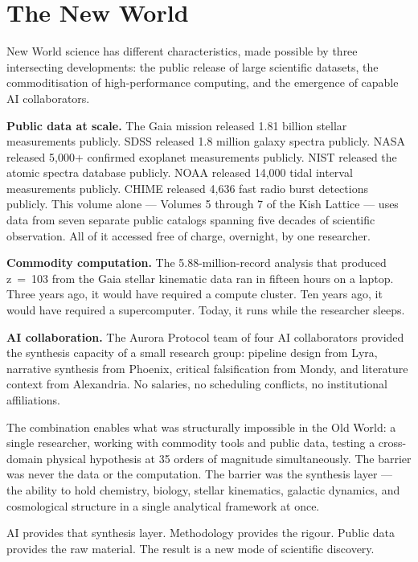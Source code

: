 \documentclass[11pt, letterpaper, openany]{book}
\begin{document}
\section*{The New World}

New World science has different characteristics, made possible by three intersecting
developments: the public release of large scientific datasets, the commoditisation
of high-performance computing, and the emergence of capable AI collaborators.

\textbf{Public data at scale.} The Gaia mission released 1.81 billion stellar
measurements publicly. SDSS released 1.8 million galaxy spectra publicly. NASA released
5,000+ confirmed exoplanet measurements publicly. NIST released the atomic spectra
database publicly. NOAA released 14,000 tidal interval measurements publicly. CHIME
released 4,636 fast radio burst detections publicly. This volume alone --- Volumes
5 through 7 of the Kish Lattice --- uses data from seven separate public catalogs
spanning five decades of scientific observation. All of it accessed free of charge,
overnight, by one researcher.

\textbf{Commodity computation.} The 5.88-million-record analysis that produced z~=~103
from the Gaia stellar kinematic data ran in fifteen hours on a laptop. Three years ago,
it would have required a compute cluster. Ten years ago, it would have required a
supercomputer. Today, it runs while the researcher sleeps.

\textbf{AI collaboration.} The Aurora Protocol team of four AI collaborators provided
the synthesis capacity of a small research group: pipeline design from Lyra, narrative
synthesis from Phoenix, critical falsification from Mondy, and literature context from
Alexandria. No salaries, no scheduling conflicts, no institutional affiliations.

The combination enables what was structurally impossible in the Old World: a single
researcher, working with commodity tools and public data, testing a cross-domain
physical hypothesis at 35 orders of magnitude simultaneously. The barrier was never
the data or the computation. The barrier was the synthesis layer --- the ability to
hold chemistry, biology, stellar kinematics, galactic dynamics, and cosmological
structure in a single analytical framework at once.

AI provides that synthesis layer. Methodology provides the rigour. Public data provides
the raw material. The result is a new mode of scientific discovery.
\end{document}
